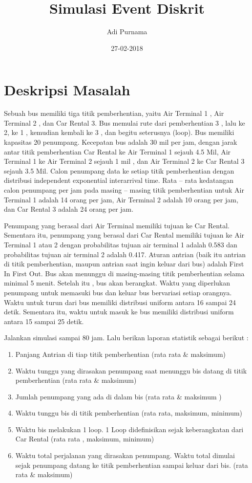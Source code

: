 \documentclass{article}
\title{Simulasi Event Diskrit}
\date{27-02-2018}
\author{Adi Purnama}
\begin{document}
	\maketitle

	\section{Deskripsi Masalah}	
Sebuah bus memiliki tiga titik pemberhentian, yaitu Air Terminal 1 , Air Terminal 2 , dan Car Rental 3.
Bus memulai rute dari pemberhentian 3 , lalu ke 2, ke 1 , kemudian kembali ke 3 , dan begitu seterusnya (loop). 
Bus memiliki kapasitas 20 penumpang. Kecepatan bus adalah 30 mil per jam, dengan jarak antar titik pemberhentian Car Rental ke Air Terminal 1 sejauh 4.5 Mil, Air Terminal 1 ke Air Terminal 2 sejauh 1 mil , dan Air Terminal 2 ke Car Rental 3 sejauh 3.5 Mil.
Calon penumpang data ke setiap titik pemberhentian dengan distribusi independent exponential interarrival time. Rata – rata kedatangan calon penumpang per jam pada masing – masing titik pemberhentian untuk Air Terminal 1 adalah 14 orang per jam, Air Terminal 2 adalah 10 orang per jam, dan Car Rental 3 adalah 24 orang per jam.

Penumpang yang berasal dari Air Terminal memiliki tujuan ke Car Rental. Sementara itu, penumpang yang berasal dari Car Rental memiliki tujuan ke Air Terminal 1 atau 2 dengan probabilitas tujuan air terminal 1	adalah 0.583 dan probabilitas tujuan air terminal 2 adalah 0.417.
Aturan antrian (baik itu antrian di titik pemberhentian, maupun antrian saat ingin keluar dari bus) adalah First In First Out. Bus akan menunggu di masing-masing titik pemberhentian selama minimal 5 menit. Setelah itu , bus akan berangkat.
Waktu yang diperlukan penumpang untuk memasuki bus dan keluar bus bervariasi setiap orangnya. 
Waktu untuk turun dari bus memiliki distribusi uniform antara 16 sampai 24 detik. Sementara itu, waktu untuk masuk ke bus memiliki distribusi uniform antara 15 sampai 25 detik.

Jalankan simulasi sampai 80 jam. Lalu berikan laporan statistik sebagai berikut :
	\begin{enumerate}
	\item Panjang Antrian di tiap titik pemberhentian (rata rata \& maksimum)
	\item Waktu tunggu yang dirasakan penumpang saat menunggu bis datang di titik pemberhentian (rata rata \& maksimum)
	\item Jumlah penumpang yang ada di dalam bis (rata rata \& maksimum )
	\item Waktu tunggu bis di titik pemberhentian (rata rata, maksimum, minimum)
	\item Waktu bis melakukan 1 loop. 1 Loop didefinisikan sejak keberangkatan dari Car Rental (rata rata , maksimum, minimum)
	\item Waktu total perjalanan yang dirasakan penumpang. Waktu total dimulai sejak penumpang datang ke titik pemberhentian sampai keluar dari bis. (rata rata \& maksimum)
	\end{enumerate}
\end{document}
